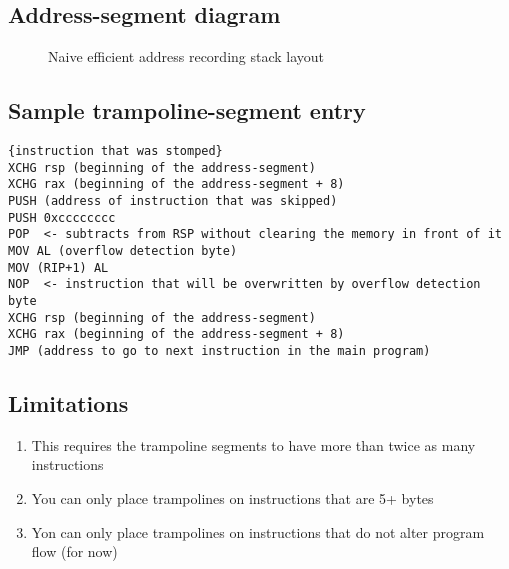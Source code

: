 \subsection{Address-segment diagram}

\begin{figure}
\begin{drawstack}
  \startframe
   
   \cellcom{}
     
  \startframe
   \cellcom{}
     
   
   \cellcom{}
   \cellcom{}
   \cellcom{}
   
\end{drawstack}

  \caption{Naive efficient address recording stack layout}
\end{figure}


\subsection{Sample trampoline-segment entry}

\begin{verbatim}
{instruction that was stomped}
XCHG rsp (beginning of the address-segment)
XCHG rax (beginning of the address-segment + 8)
PUSH (address of instruction that was skipped)
PUSH 0xcccccccc
POP  <- subtracts from RSP without clearing the memory in front of it 
MOV AL (overflow detection byte) 
MOV (RIP+1) AL
NOP  <- instruction that will be overwritten by overflow detection byte
XCHG rsp (beginning of the address-segment)
XCHG rax (beginning of the address-segment + 8)
JMP (address to go to next instruction in the main program)
\end{verbatim}


\subsection{Limitations}
\begin{enumerate}
    \item This requires the trampoline segments to have more than twice as many instructions
    \item You can only place trampolines on instructions that are 5+ bytes 
    \item Yon can only place trampolines on instructions that do not alter program flow (for now)
\end{enumerate}
